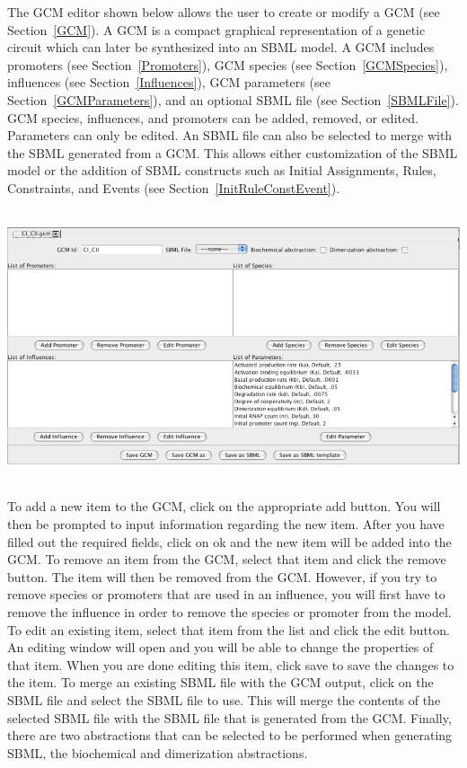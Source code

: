 \documentclass[titlepage,11pt]{article}
\begin{document}
\noindent
The GCM editor shown below allows the user to create or modify a GCM 
(see Section~\ref{GCM}).  A GCM is a compact graphical representation 
of a genetic circuit which can later be synthesized into an SBML model. 
A GCM includes promoters (see Section~\ref{Promoters}),
GCM species (see Section~\ref{GCMSpecies}), 
influences (see Section~\ref{Influences}), 
GCM parameters (see Section~\ref{GCMParameters}), and an optional
SBML file (see Section~\ref{SBMLFile}).  GCM species, influences, 
and promoters can be added, removed, or edited. Parameters can only be edited. 
An SBML file can also be selected to merge with the SBML generated from a GCM.
This allows either customization of the SBML model or the addition of SBML
constructs such as Initial Assignments, Rules, Constraints, 
and Events (see Section~\ref{InitRuleConstEvent}).
\begin{center}
\includegraphics[height=80mm]{screenshots/GCMedit}
\end{center}

To add a new item to the GCM, click on the appropriate add button. You
will then be prompted to input information regarding the new
item. After you have filled out the required fields, click on ok
and the new item will be added into the GCM.
To remove an item from the GCM, select that item and click the
remove button. The item will then be removed from the GCM.
However, if you try to remove species or promoters that are used in
an influence, you will first have to remove the influence in
order to remove the species or promoter from the model.
To edit an existing item, select that item from the list and
click the edit button. An editing window will open and you will
be able to change the properties of that item. When you are done
editing this item, click save to save the changes to the item. 
To merge an existing SBML file with the GCM output, click on
the SBML file and select the SBML file to use. This will merge
the contents of the selected SBML file with the SBML file that is 
generated from the GCM.  Finally, there are two abstractions that can
be selected to be performed when generating SBML, the biochemical and
dimerization abstractions.
\end{document}
